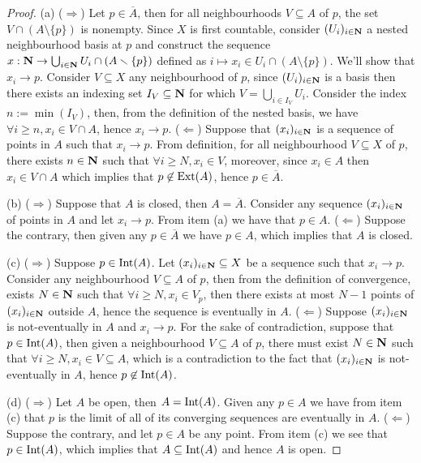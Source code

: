 \begin{proof}
  (a) (\(\Rightarrow\)) Let \(p \in \overline A\), then for all neighbourhoods
  \(V \subseteq A\) of \(p\), the set \(V \cap (A \setminus \{p\})\) is
  nonempty. Since \(X\) is first countable, consider \((U_i)_{i \in
  \mathbf{N}}\) a nested neighbourhood basis at \(p\) and construct the sequence
  \(x : \mathbf{N} \to \bigcup_{i \in \mathbf{N}} U_i \cap (A \smallsetminus \{p\})
  \) defined as \(i \mapsto x_i \in U_i \cap (A \setminus \{p\})\). We'll show
  that \(x_i \to p\). Consider \(V \subseteq X\) any neighbourhood of \(p\),
  since \((U_i)_{i \in \mathbf{N}}\) is a basis then there exists an indexing set
  \(I_{V} \subseteq \mathbf{N}\) for which \(V = \bigcup_{i \in  I_V} U_i\).
  Consider the index \(n := \min(I_V)\), then, from the definition of the nested
  basis, we have \(\forall i \geq n, x_i \in V \cap A\), hence \(x_i \to p\).
  (\(\Leftarrow\)) Suppose that \((x_i)_{i \in \mathbf{N}}\) is a sequence of
  points in \(A\) such that \(x_i \to p\). From definition, for all
  neighbourhood \(V \subseteq X\) of \(p\), there exists \(n \in \mathbf{N}\)
  such that \(\forall i \geq N, x_i \in V\), moreover, since \(x_i \in A\) then
  \(x_i \in V \cap A\) which implies that \(p \not\in \operatorname{Ext}(A)\), hence \(p \in
  \overline A\).

  (b) (\(\Rightarrow\)) Suppose that \(A\) is closed, then \(A = \overline A\).
  Consider any sequence \((x_i)_{i \in \mathbf{N}}\) of points in \(A\) and let
  \(x_i \to p\). From item (a) we have that \(p \in A\). (\(\Leftarrow\))
  Suppose the contrary, then given any \(p \in \overline A\) we have \(p \in
  A\), which implies that \(A\) is closed.

  (c) (\(\Rightarrow\)) Suppose \(p \in \operatorname{Int}(A)\). Let \((x_i)_{i \in
  \mathbf{N}} \subseteq X\) be a sequence such that \(x_i \to p\). Consider any
  neighbourhood \(V \subseteq A\) of \(p\), then from the definition of
  convergence, exists \(N \in \mathbf{N}\) such that \(\forall i \geq N, x_i \in
  V_p\), then there exists at most \(N - 1\) points of \((x_i)_{i \in
  \mathbf{N}}\) outside \(A\), hence the sequence is eventually in \(A\).
  (\(\Leftarrow\)) Suppose \((x_i)_{i \in \mathbf{N}}\) is not-eventually in
  \(A\) and \(x_i \to p\). For the sake of contradiction, suppose that \(p \in
  \operatorname{Int}(A)\), then given a neighbourhood \(V \subseteq A\) of \(p\), there must
  exist \(N \in \mathbf{N}\) such that \(\forall i \geq N, x_i \in V \subseteq
  A\), which is a contradiction to the fact that \((x_i)_{i \in \mathbf{N}}\) is
  not-eventually in \(A\), hence \(p \not\in \operatorname{Int}(A)\).

  (d) (\(\Rightarrow\)) Let \(A\) be open, then \(A = \operatorname{Int}(A)\). Given any \(p
  \in A\) we have from item (c) that \(p\) is the limit of all of its converging
  sequences are eventually in \(A\). (\(\Leftarrow\)) Suppose the contrary, and
  let \(p \in A\) be any point. From item (c) we see that \(p \in \operatorname{Int}(A)\),
  which implies that \(A \subseteq \operatorname{Int}(A)\) and hence \(A\) is open.
\end{proof}

